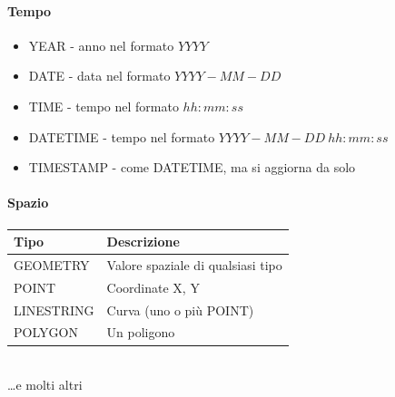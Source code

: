 \documentclass[12pt,a4paper]{article}
\begin{document}
\paragraph{Tempo\\}
\begin{itemize}
\item YEAR - anno nel formato $YYYY$
\item DATE - data nel formato $YYYY - MM - DD$
\item TIME - tempo nel formato $hh:mm:ss$
\item DATETIME - tempo nel formato $YYYY-MM-DD\ hh:mm:ss$
\item TIMESTAMP - come DATETIME, ma si aggiorna da solo
\end{itemize}

\paragraph{Spazio\\}
\begin{center}
\begin{tabular}{ll}
\textbf{Tipo} & \textbf{Descrizione}\\ \hline
GEOMETRY & Valore spaziale di qualsiasi tipo\\ \hline
POINT & Coordinate X, Y\\ \hline
LINESTRING & Curva (uno o più POINT)\\ \hline
POLYGON & Un poligono\\ 
\end{tabular}\\ \SmallSep \dots e molti altri\end{center}
\end{document}
